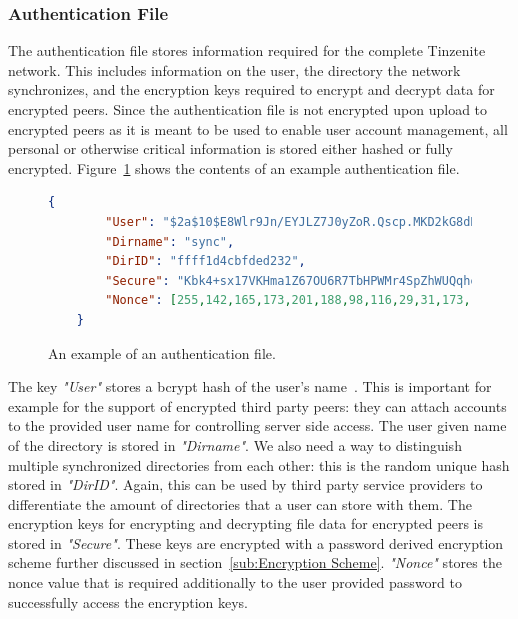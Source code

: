 \subsubsection{Authentication File}
\label{subs:Authentication File}

The authentication file stores information required for the complete Tinzenite network.
This includes information on the user, the directory the network synchronizes, and the encryption keys required to encrypt and decrypt data for encrypted peers.
Since the authentication file is not encrypted upon upload to encrypted peers as it is meant to be used to enable user account management, all personal or otherwise critical information is stored either hashed or fully encrypted.
Figure~\ref{json:auth_object} shows the contents of an example authentication file.

\begin{figure}[htp]
    \begin{lstlisting}[language=json,firstnumber=0]
    {
        "User": "$2a$10$E8Wlr9Jn/EYJLZ7J0yZoR.Qscp.MKD2kG8dHF7OQWYNA1mCfp.Qqe",
        "Dirname": "sync",
        "DirID": "ffff1d4cbfded232",
        "Secure": "Kbk4+sx17VKHma1Z67OU6R7TbHPWMr4SpZhWUQqheS/CNcKKHVYjTTSv0rbF4qDAa0vwikigsm7wHhy4iGjWB84i0ErO7rNwhqrPPxudeDM=",
        "Nonce": [255,142,165,173,201,188,98,116,29,31,173,181,84,84,137,54,159,50,193,248,51,162,76,195]
    }
    \end{lstlisting}
\caption[Authentication JSON Object]{An example of an authentication file.}
\label{json:auth_object}
\end{figure}

The key \textit{"User"} stores a bcrypt hash of the user's name~\cite{web:site:wiki:bcrypt}.
This is important for example for the support of encrypted third party peers: they can attach accounts to the provided user name for controlling server side access.
The user given name of the directory is stored in \textit{"Dirname"}.
We also need a way to distinguish multiple synchronized directories from each other: this is the random unique hash stored in \textit{"DirID"}.
Again, this can be used by third party service providers to differentiate the amount of directories that a user can store with them.
The encryption keys for encrypting and decrypting file data for encrypted peers is stored in \textit{"Secure"}.
These keys are encrypted with a password derived encryption scheme further discussed in section~\ref{sub:Encryption Scheme}.
\textit{"Nonce"} stores the nonce value that is required additionally to the user provided password to successfully access the encryption keys.

